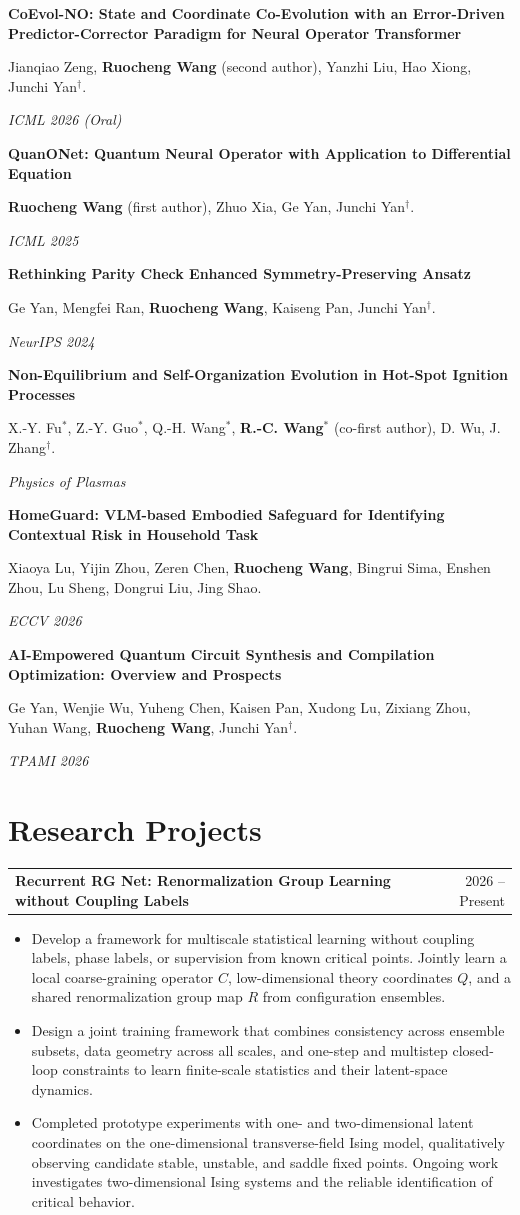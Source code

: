 \documentclass[letterpaper,11pt]{article}
\makeatletter
\newcommand{\publication}[3]{%
  \begingroup
  \setlength{\parskip}{0pt}
  \textbf{#1}\par
  #2\par
  \textit{#3}\par
  \endgroup\vspace{5pt}
}
\newcommand{\project}[2]{%
  \begin{tabularx}{\textwidth}{@{}>{\raggedright\arraybackslash}X@{\hspace{1.2em}}r@{}}
    \textbf{#1} & #2
  \end{tabularx}\par\vspace{1pt}
}
\makeatother
\begin{document}
\publication
  {CoEvol-NO: State and Coordinate Co-Evolution with an Error-Driven Predictor-Corrector Paradigm for Neural Operator Transformer}
  {Jianqiao Zeng, \textbf{Ruocheng Wang} (second author), Yanzhi Liu, Hao Xiong, Junchi Yan$^\dagger$.}
  {ICML 2026 (Oral)}

\publication
  {QuanONet: Quantum Neural Operator with Application to Differential Equation}
  {\textbf{Ruocheng Wang} (first author), Zhuo Xia, Ge Yan, Junchi Yan$^\dagger$.}
  {ICML 2025}

\publication
  {Rethinking Parity Check Enhanced Symmetry-Preserving Ansatz}
  {Ge Yan, Mengfei Ran, \textbf{Ruocheng Wang}, Kaiseng Pan, Junchi Yan$^\dagger$.}
  {NeurIPS 2024}

\publication
  {Non-Equilibrium and Self-Organization Evolution in Hot-Spot Ignition Processes}
  {X.-Y. Fu$^*$, Z.-Y. Guo$^*$, Q.-H. Wang$^*$, \textbf{R.-C. Wang}$^*$ (co-first author), D. Wu, J. Zhang$^\dagger$.}
  {Physics of Plasmas}

\publication
  {HomeGuard: VLM-based Embodied Safeguard for Identifying Contextual Risk in Household Task}
  {Xiaoya Lu, Yijin Zhou, Zeren Chen, \textbf{Ruocheng Wang}, Bingrui Sima, Enshen Zhou, Lu Sheng, Dongrui Liu, Jing Shao.}
  {ECCV 2026}

\publication
  {AI-Empowered Quantum Circuit Synthesis and Compilation Optimization: Overview and Prospects}
  {Ge Yan, Wenjie Wu, Yuheng Chen, Kaisen Pan, Xudong Lu, Zixiang Zhou, Yuhan Wang, \textbf{Ruocheng Wang}, Junchi Yan$^\dagger$.}
  {TPAMI 2026}

\newpage
\section{Research Projects}

\project{Recurrent RG Net: Renormalization Group Learning without Coupling Labels}
  {2026 -- Present}
\begin{itemize}
  \item Develop a framework for multiscale statistical learning without coupling labels, phase labels, or supervision from known critical points. Jointly learn a local coarse-graining operator $C$, low-dimensional theory coordinates $Q$, and a shared renormalization group map $R$ from configuration ensembles.
  \item Design a joint training framework that combines consistency across ensemble subsets, data geometry across all scales, and one-step and multistep closed-loop constraints to learn finite-scale statistics and their latent-space dynamics.
  \item Completed prototype experiments with one- and two-dimensional latent coordinates on the one-dimensional transverse-field Ising model, qualitatively observing candidate stable, unstable, and saddle fixed points. Ongoing work investigates two-dimensional Ising systems and the reliable identification of critical behavior.
\end{itemize}
\end{document}
